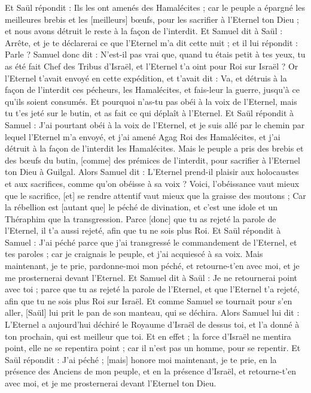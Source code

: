 \begin{multicols}{2}
Et Saül répondit : Ils les ont amenés des Hamalécites ; car le peuple a épargné les meilleures brebis et les [meilleurs] bœufs, pour les sacrifier à l'Eternel ton Dieu ; et nous avons détruit le reste à la façon de l'interdit.
Et Samuel dit à Saül : Arrête, et je te déclarerai ce que l'Eternel m'a dit cette nuit ; et il lui répondit : Parle ?
Samuel donc dit : N'est-il pas vrai que, quand tu étais petit à tes yeux, tu as été fait Chef des Tribus d'Israël, et l'Eternel t'a oint pour Roi sur Israël ?
Or l'Eternel t'avait envoyé en cette expédition, et t'avait dit : Va, et détruis à la façon de l'interdit ces pécheurs, les Hamalécites, et fais-leur la guerre, jusqu'à ce qu'ils soient consumés.
Et pourquoi n'as-tu pas obéi à la voix de l'Eternel, mais tu t'es jeté sur le butin, et as fait ce qui déplaît à l'Eternel.
Et Saül répondit à Samuel : J'ai pourtant obéi à la voix de l'Eternel, et je suis allé par le chemin par lequel l'Eternel m'a envoyé, et j'ai amené Agag Roi des Hamalécites, et j'ai détruit à la façon de l'interdit les Hamalécites.
Mais le peuple a pris des brebis et des bœufs du butin, [comme] des prémices de l'interdit, pour sacrifier à l'Eternel ton Dieu à Guilgal.
Alors Samuel dit : L'Eternel prend-il plaisir aux holocaustes et aux sacrifices, comme qu'on obéisse à sa voix ? Voici, l'obéissance vaut mieux que le sacrifice, [et] se rendre attentif vaut mieux que la graisse des moutons ;
Car la rébellion est [autant que] le péché de divination, et c'est une idole et un Théraphim que la transgression. Parce [donc] que tu as rejeté la parole de l'Eternel, il t'a aussi rejeté, afin que tu ne sois plus Roi.
Et Saül répondit à Samuel : J'ai péché parce que j'ai transgressé le commandement de l'Eternel, et tes paroles ; car je craignais le peuple, et j'ai acquiescé à sa voix.
Mais maintenant, je te prie, pardonne-moi mon péché, et retourne-t'en avec moi, et je me prosternerai devant l'Eternel.
Et Samuel dit à Saül : Je ne retournerai point avec toi ; parce que tu as rejeté la parole de l'Eternel, et que l'Eternel t'a rejeté, afin que tu ne sois plus Roi sur Israël.
Et comme Samuel se tournait pour s'en aller, [Saül] lui prit le pan de son manteau, qui se déchira.
Alors Samuel lui dit : L'Eternel a aujourd'hui déchiré le Royaume d'Israël de dessus toi, et l'a donné à ton prochain, qui est meilleur que toi.
Et en effet ; la force d'Israël ne mentira point, elle ne se repentira point ; car il n'est pas un homme, pour se repentir.
Et Saül répondit : J'ai péché ; [mais] honore moi maintenant, je te prie, en la présence des Anciens de mon peuple, et en la présence d'Israël, et retourne-t'en avec moi, et je me prosternerai devant l'Eternel ton Dieu.

\end{multicols}
